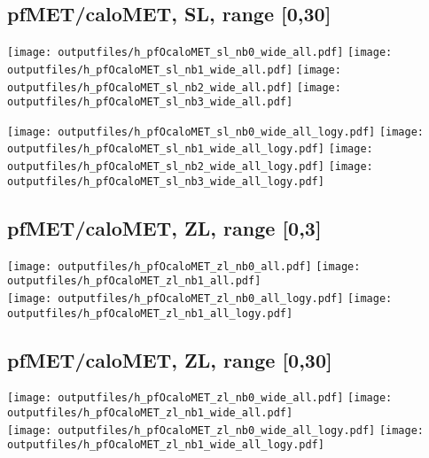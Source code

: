 \documentclass[11pt]{article}
\begin{document}
    \subsection{ pfMET/caloMET, SL, range [0,30]}

    \noindent
     \texttt{[image: outputfiles/h\_pfOcaloMET\_sl\_nb0\_wide\_all.pdf]}
     \texttt{[image: outputfiles/h\_pfOcaloMET\_sl\_nb1\_wide\_all.pdf]}
     \texttt{[image: outputfiles/h\_pfOcaloMET\_sl\_nb2\_wide\_all.pdf]}
     \texttt{[image: outputfiles/h\_pfOcaloMET\_sl\_nb3\_wide\_all.pdf]}

    \noindent
     \texttt{[image: outputfiles/h\_pfOcaloMET\_sl\_nb0\_wide\_all\_logy.pdf]}
     \texttt{[image: outputfiles/h\_pfOcaloMET\_sl\_nb1\_wide\_all\_logy.pdf]}
     \texttt{[image: outputfiles/h\_pfOcaloMET\_sl\_nb2\_wide\_all\_logy.pdf]}
     \texttt{[image: outputfiles/h\_pfOcaloMET\_sl\_nb3\_wide\_all\_logy.pdf]}

    \clearpage




    \subsection{ pfMET/caloMET, ZL, range [0,3]}

    \noindent
     \texttt{[image: outputfiles/h\_pfOcaloMET\_zl\_nb0\_all.pdf]}
     \texttt{[image: outputfiles/h\_pfOcaloMET\_zl\_nb1\_all.pdf]} \\

    \noindent
     \texttt{[image: outputfiles/h\_pfOcaloMET\_zl\_nb0\_all\_logy.pdf]}
     \texttt{[image: outputfiles/h\_pfOcaloMET\_zl\_nb1\_all\_logy.pdf]}

    \clearpage



    \subsection{ pfMET/caloMET, ZL, range [0,30]}

    \noindent
     \texttt{[image: outputfiles/h\_pfOcaloMET\_zl\_nb0\_wide\_all.pdf]}
     \texttt{[image: outputfiles/h\_pfOcaloMET\_zl\_nb1\_wide\_all.pdf]} \\

    \noindent
     \texttt{[image: outputfiles/h\_pfOcaloMET\_zl\_nb0\_wide\_all\_logy.pdf]}
     \texttt{[image: outputfiles/h\_pfOcaloMET\_zl\_nb1\_wide\_all\_logy.pdf]}

    \clearpage



  
\end{document}
